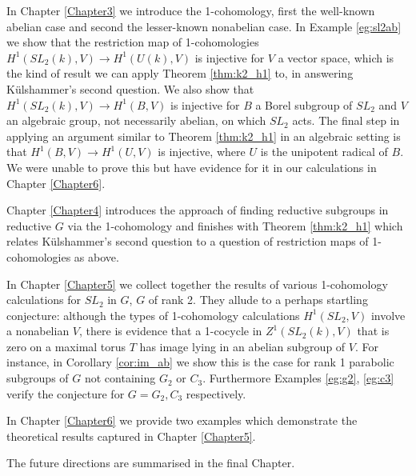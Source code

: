 In Chapter \ref{Chapter3} we introduce the 1-cohomology, first the well-known abelian case and second the lesser-known nonabelian case. In Example \ref{eg:sl2ab} we show that the restriction map of 1-cohomologies $H^1(SL_2(k), V) \rightarrow H^1(U(k), V)$ is injective for $V$ a vector space, which is the kind of result we can apply Theorem \ref{thm:k2_h1} to, in answering K\"ulshammer's second question. We also show that $H^1(SL_2(k), V) \rightarrow H^1(B, V)$ is injective for $B$ a Borel subgroup of $SL_2$ and $V$ an algebraic group, not necessarily abelian, on which $SL_2$ acts. The final step in applying an argument similar to Theorem \ref{thm:k2_h1} in an algebraic setting is that $H^1(B, V) \rightarrow H^1(U, V)$ is injective, where $U$ is the unipotent radical of $B$. We were unable to prove this but have evidence for it in our calculations in Chapter \ref{Chapter6}.

Chapter \ref{Chapter4} introduces the approach of finding reductive subgroups in reductive $G$ via the 1-cohomology and finishes with Theorem \ref{thm:k2_h1} which relates K\"ulshammer's second question to a question of restriction maps of 1-cohomologies as above.

In Chapter \ref{Chapter5} we collect together the results of various 1-cohomology calculations for $SL_2$ in $G$, $G$ of rank 2. They allude to a perhaps startling conjecture: although the types of 1-cohomology calculations $H^1(SL_2, V)$ involve a nonabelian $V$, there is evidence that a 1-cocycle in $Z^1(SL_2(k), V)$ that is zero on a maximal torus $T$ has image lying in an abelian subgroup of $V$. For instance, in Corollary \ref{cor:im_ab} we show this is the case for rank 1 parabolic subgroups of $G$ not containing $G_2$ or $C_3$. Furthermore Examples \ref{eg:g2}, \ref{eg:c3} verify the conjecture for $G = G_2, C_3$ respectively.

In Chapter \ref{Chapter6} we provide two examples which demonstrate the theoretical results captured in Chapter \ref{Chapter5}.

The future directions are summarised in the final Chapter.
